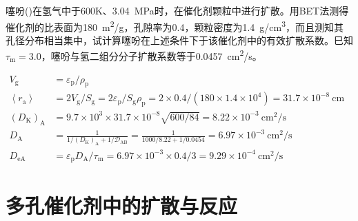 \documentclass[dvipsnames, svgnames, x11names]{beamer}
\begin{document}
\begin{frame}[t]
    \frametitle{}

    \begin{example}
        噻吩()在氢气中于600K、\SI{3.04}{MPa}时，在催化剂颗粒中进行扩散。用BET法测得催化剂的比表面为\SI{180}{m^2/g}，孔隙率为0.4，颗粒密度为\SI{1.4}{g/cm^3}，而且测知其孔径分布相当集中，试计算噻吩在上述条件下于该催化剂中的有效扩散系数。巳知$\tau_{\mathrm{m}} = 3.0$，噻吩与氢二组分分子扩散系数等于\SI{0.0457}{cm^2/s}。
    \end{example}\pause
    $\begin{aligned}
        V_{\mathrm{g}} &=\varepsilon_{\mathrm{p}} / \rho_{\mathrm{p}} \\
        \left\langle r_{\mathrm{a}}\right\rangle &= 2V_{\mathrm{g}}/S_{\mathrm{g}} = 2 \varepsilon_{\mathrm{p}} / S_{\mathrm{g}} \rho_{\mathrm{p}}=2 \times 0.4 /(180 \times 1.4 \times 10^{4})=31.7 \times 10^{-8} \mathrm{~cm} \\
        (D_{\mathrm{K}})_{\mathrm{A}} &=9.7 \times 10^{3} \times 31.7 \times 10^{-8} \sqrt{600 / 84}=8.22 \times 10^{-3} \mathrm{~cm}^{2} / \mathrm{s} \\
        D_{\mathrm{A}} &=\frac{1}{1 /(D_{\mathrm{K}})_{\mathrm{A}}+1 / \mathscr{D}_{\mathrm{AB}}}=\frac{1}{1000 / 8.22+1 / 0.0454}=6.97 \times 10^{-3} \mathrm{~cm}^{2} / \mathrm{s} \\
        D_{\mathrm{eA}} &= \varepsilon_{\mathrm{p}} D_{\mathrm{A}}/ \tau_{\mathrm{m}}=6.97 \times 10^{-3} \times 0.4 / 3=9.29 \times 10^{-4} \mathrm{~cm}^{2} / \mathrm{s}
        \end{aligned}$

\end{frame}


\section{多孔催化剂中的扩散与反应}
\end{document}
